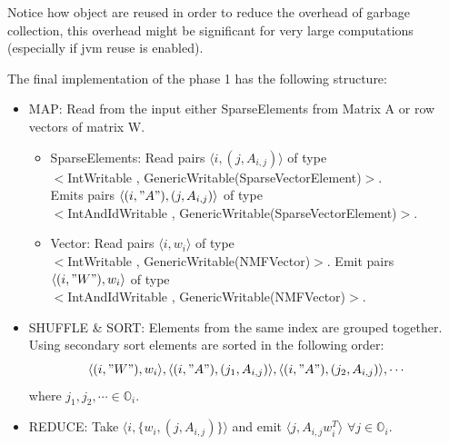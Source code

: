 \documentclass[a4paper,12pt]{article}
\begin{document}
 
Notice how object are reused in order to reduce the overhead of garbage collection, this overhead might be significant for very large computations (especially if jvm reuse is enabled).

The final implementation of the phase 1 has the following structure:

        \begin{itemize}
        
          \item MAP: Read from the input either SparseElements from Matrix A  or  row vectors of matrix W.
          \begin{itemize}
          
          \item SparseElements: Read pairs $\langle i,( j, A_{i,j}) \rangle $ of type \\
          $<$IntWritable , GenericWritable(SparseVectorElement)$>$.
          \\
          Emits pairs $\langle (i,"A"),( j, A_{i,j}) \rangle $ of type \\ 
          $<$IntAndIdWritable , GenericWritable(SparseVectorElement)$>$.
          
          \item Vector: Read pairs $\langle i, w_i \rangle$ of type \\
          $<$IntWritable , GenericWritable(NMFVector)$>$.
          Emit pairs $\langle (i,"W"), w_i \rangle$ of type \\
          $<$IntAndIdWritable , GenericWritable(NMFVector)$>$.          
          \end{itemize}

		\item SHUFFLE \& SORT: Elements from the same index are grouped together.
		Using secondary sort elements are sorted in the following order: $$\langle (i,"W"), w_i \rangle,\langle (i,"A"),( j_1, A_{i,j}) \rangle , \langle (i,"A"),( j_2, A_{i,j}) \rangle , \cdots$$ where $j_1,j_2,\cdots \in \mathbb{O}_i $.
			
         \item REDUCE: Take  $ \langle i, \{w_{i}, (j, A_{i,j}) \}
           \rangle$ and emit  $ \langle j, A_{i,j}  w_{i}^{T}
           \rangle$ $\forall j \in \mathbb{O}_i $.

         \end{itemize}
\end{document}

